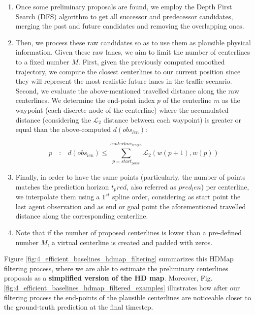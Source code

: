 \begin{enumerate}
	\item Once some preliminary proposals are found, we employ the Depth First Search (DFS) algorithm to get all successor and predecessor candidates, merging the past and future candidates and removing the overlapping ones.
	
	\item Then, we process these raw candidates so as to use them as plausible physical information. Given these raw lanes, we aim to limit the number of centerlines to a fixed number $M$. First, given the previously computed smoothed trajectory, we compute the closest centerlines to our current position since they will represent the most realistic future lanes in the traffic scenario. Second, we evaluate the above-mentioned travelled distance along the raw centerlines. We determine the end-point index $p$ of the centerline $m$ as the waypoint (each discrete node of the centerline) where the accumulated distance (considering the $\mathcal{L}_2$ distance between each waypoint) is greater or equal than the above-computed $d(obs_{len})$:
	
	\begin{equation}
		p \quad \textbf{:} \quad d(obs_{len}) \leq \sum_{p=start_{point}}^{centerline_{length}} \mathcal{L}_2(w(p+1),w(p))
	\end{equation}

	\item Finally, in order to have the same points (particularly, the number of points matches the prediction horizon $t_pred$, also referred as $pred_len$) per centerline, we interpolate them using a $1^{st}$ spline order, considering as start point the last agent observation and as end or goal point the aforementioned travelled distance along the corresponding centerline.
	
	\item Note that if the number of proposed centerlines is lower than a pre-defined number $M$, a virtual centerline is created and padded with zeros.
\end{enumerate}

Figure \ref{fig:4_efficient_baselines_hdmap_filtering} summarizes this HDMap filtering process, where we are able to estimate the preliminary centerlines proposals as a \textbf{simplified version of the HD map}. Moreover, Fig. \ref{fig:4_efficient_baselines_hdmap_filtered_examples} illustrates how after our filtering process the end-points of the plausible centerlines are noticeable closer to the ground-truth prediction at the final timestep. 

